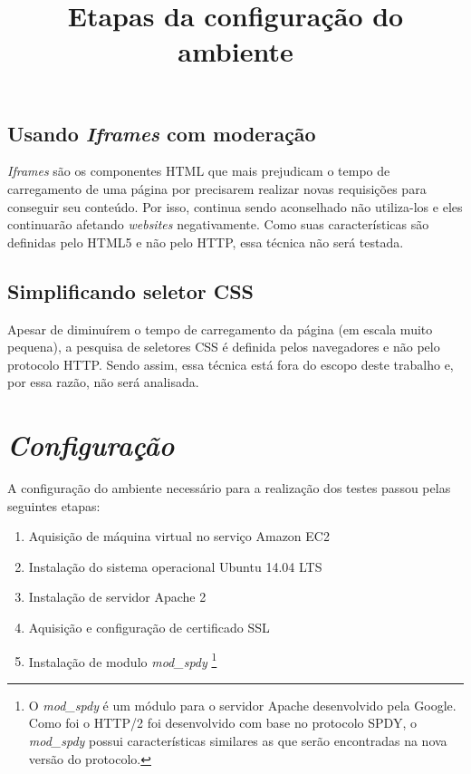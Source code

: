 \subsection{Usando \textit{Iframes} com moderação}
\label{subsec:preliminares_tec24}
\textit{Iframes} são os componentes HTML que mais prejudicam o tempo de carregamento de uma página por precisarem realizar novas requisições para conseguir seu conteúdo. Por isso, continua sendo aconselhado não utiliza-los e eles continuarão afetando \textit{websites} negativamente. Como suas características são definidas pelo HTML5 e não pelo HTTP, essa técnica não será testada.

\subsection{Simplificando seletor CSS}
\label{subsec:preliminares_tec25}
Apesar de diminuírem o tempo de carregamento da página (em escala muito pequena), a pesquisa de seletores CSS é definida pelos navegadores e não pelo protocolo HTTP. Sendo assim, essa técnica está fora do escopo deste trabalho e, por essa razão, não será analisada.





\section{\textit{Configuração}}
\label{sec:configuracao}

A configuração do ambiente necessário para a realização dos testes passou pelas seguintes etapas:

\begin{enumerate}
	\item Aquisição de máquina virtual no serviço Amazon EC2
	\item Instalação do sistema operacional Ubuntu 14.04 LTS
	\item Instalação de servidor Apache 2
	\item Aquisição e configuração de certificado SSL
	\item Instalação de modulo \textit{mod\_spdy} \footnote{O \textit{mod\_spdy} é um módulo para o servidor Apache desenvolvido pela Google. Como foi o HTTP/2 foi desenvolvido com base no protocolo SPDY, o \textit{mod\_spdy} possui características similares as que serão encontradas na nova versão do protocolo.}
	\title{Etapas da configuração do ambiente}
	\label{list:lista_configuracao}
\end{enumerate}

